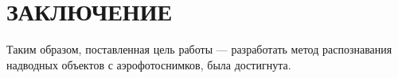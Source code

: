 \chapter*{ЗАКЛЮЧЕНИЕ}

Таким образом, поставленная цель работы --- разработать метод распознавания надводных объектов с аэрофотоснимков, была достигнута.